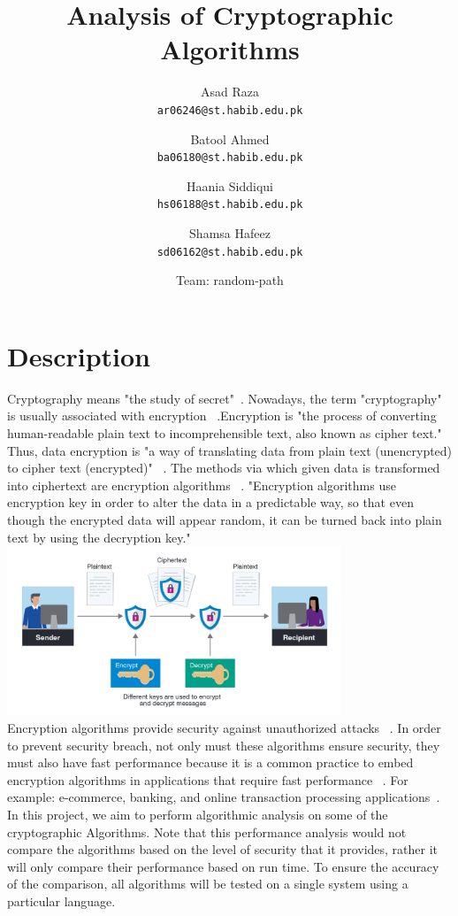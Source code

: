 \documentclass[a4paper]{article}
\title{Analysis of Cryptographic Algorithms}
\author{
  Asad Raza\\
  \texttt{ar06246@st.habib.edu.pk}
  \and
  Batool Ahmed\\
  \texttt{ba06180@st.habib.edu.pk}
  \and 
  Haania Siddiqui\\
  \texttt{hs06188@st.habib.edu.pk}
  \and
  Shamsa Hafeez\\
  \texttt{sd06162@st.habib.edu.pk}
  \and 
  Team: random-path \\
}
\begin{document}
\section{Description} %

Cryptography means "the study of secret"~\cite{al2006performance}. Nowadays, the term "cryptography" is usually associated with encryption ~\cite{al2006performance}.Encryption is "the process of converting human-readable plain text to incomprehensible text, also known as cipher text." ~\cite{cloudflare} Thus, data encryption is "a way of translating data from plain text (unencrypted) to cipher text (encrypted)" ~\cite{IBM}. The methods via which given data is transformed into ciphertext are encryption algorithms  ~\cite{cloudflare}. "Encryption algorithms use encryption key in order to alter the data in a predictable way, so that even though the encrypted data will appear random, it can be turned back into plain text by using the decryption key."  ~\cite{cloudflare} \\
\includegraphics[width=10cm]{images/what-is-encryption.png}\\
Encryption algorithms provide security against unauthorized attacks ~\cite{1598556}. In order to prevent security breach, not only must these algorithms ensure security, they must also have fast performance because it is a common practice to embed encryption algorithms in applications that require fast performance ~\cite{1598556}. For example: e-commerce, banking, and online transaction processing applications~\cite{1598556}. \\

In this project, we aim to perform algorithmic analysis on some of the cryptographic Algorithms. Note that this performance analysis would not compare the algorithms based on the level of security that it provides, rather it will only compare their performance based on run time. To ensure the accuracy of the comparison, all algorithms will be tested on a single system using a particular language.~\cite{1598556}
\end{document}
